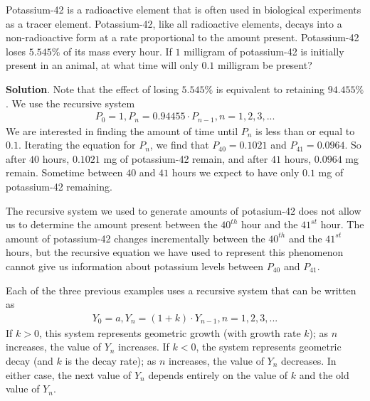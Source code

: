 \documentclass[10pt,]{book}
\theoremstyle{ptxdefinitionnotitle}
\theoremstyle{ptxdefinitiontitle}
\theoremstyle{ptxdefinitionnotitle}
\theoremstyle{ptxdefinitiontitle}
\theoremstyle{ptxdefinitionnotitle}
\theoremstyle{ptxdefinitiontitle}
\numberwithin{equation}{section}
\newcommand{\lt}{<}
\newcommand{\gt}{>}
\begin{document}
\begin{example}\label{example-radioactive-decay}
\hypertarget{p-76}{}%
Potassium-42 is a radioactive element that is often used in biological experiments as a tracer element.  Potassium-42, like all radioactive elements, decays into a non-radioactive form at a rate proportional to the amount present.  Potassium-42 loses \(5.545\%\) of its mass every hour.  If \(1\) milligram of potassium-42 is initially present in an animal, at what time will only \(0.1\) milligram be present?%
\par\smallskip%
\noindent\textbf{Solution}.\hypertarget{solution-6}{}\quad%
\hypertarget{p-77}{}%
Note that the effect of losing \(5.545\%\) is equivalent to retaining \(94.455\%\). We use the recursive system%
%
\begin{gather*}
P_0=1, P_n=0.94455 \cdot P_{n-1}, n=1,2,3,...
\end{gather*}
\hypertarget{p-78}{}%
We are interested in finding the amount of time until \(P_n\) is less than or equal to \(0.1\).  Iterating the equation for \(P_n\), we find that \(P_{40} = 0.1021\) and \(P_{41} = 0.0964\). So after \(40\) hours, \(0.1021\) mg of potassium-42 remain, and after \(41\) hours, \(0.0964\) mg remain. Sometime between \(40\) and \(41\) hours we expect to have only \(0.1\) mg of potassium-42 remaining.%
\par
\hypertarget{p-79}{}%
The recursive system we used to generate amounts of potasium-42 does not allow us to determine the amount present between the \(40^{th}\) hour and the \(41^{st}\) hour.  The amount of potassium-42 changes incrementally between the \(40^{th}\) and the \(41^{st}\) hours, but the recursive equation we have used to represent this phenomenon cannot give us information about potassium levels between \(P_{40}\) and \(P_{41}\).%
\end{example}
\hypertarget{p-80}{}%
Each of the three previous examples uses a recursive system that can be written as%
%
\begin{gather*}
Y_0=a,Y_n=(1+k) \cdot Y_{n-1}, n=1,2,3, ...
\end{gather*}
\hypertarget{p-81}{}%
If \(k \gt 0\), this system represents geometric growth (with growth rate \(k\)); as \(n\) increases, the value of \(Y_n\)  increases.  If \(k \lt 0\), the system represents geometric decay (and \(k\) is the decay rate); as \(n\) increases, the value of \(Y_n\)  decreases.  In either case, the next value of \(Y_n\) depends entirely on the value of \(k\) and the old value of \(Y_n\).%
\par
\end{document}
